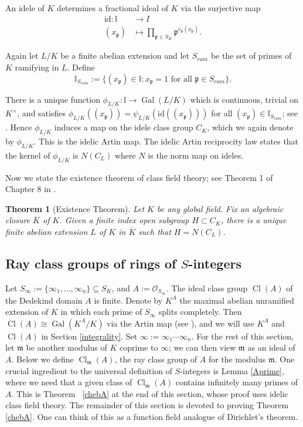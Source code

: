 \documentclass[12pt,reqno]{amsart}
\newcommand{\mm}{\mathfrak{m}}
\newcommand{\OO}{\mathcal{O}}
\newcommand{\pp}{\mathfrak{p}}
\newcommand{\II}{\mathbb{I}}
\DeclareMathOperator{\Gal}{Gal}
\DeclareMathOperator{\Cl}{Cl}
\newtheorem{thm}{Theorem}[section]
\theoremstyle{definition}
\begin{document}
An idele of $K$ determines a fractional ideal of $K$ via the surjective map
\begin{align*}
\text{id}: \II &\to I \\
(x_{\pp})&\mapsto \prod_{\pp\in S_K} \pp^{v_{\pp}(x_{\pp})}.
\end{align*}

Again let $L/K$ be a finite abelian extension and let $S_{ram}$ be the set of primes of $K$ ramifying in $L$. Define
\[
\II_{S_{ram}}:=\{(x_{\pp})\in \II: x_{\pp}=1 \text{ for all } \pp \in S_{ram}\}.
\]

There is a unique function $\phi_{L/K}: \II \to \Gal(L/K)$ which is
continuous, trivial on $K^{\times}$, and satisfies
$\phi_{L/K}((x_{\pp}))=\psi_{L/K}(\text{id}((x_{\pp})))$ for all
$(x_{\pp})\in \II_{S_{ram}}$; see  \cite{Ta67}. Hence $\phi_{L/K}$ induces a map on the idele class
group $C_K$, which we again denote by $\phi_{L/K}$. This is the idelic
Artin map. The idelic Artin reciprocity law states that the kernel of
$\phi_{L/K}$ is $N(C_L)$ where $N$ is the norm map on ideles.

Now we state the existence theorem of class field theory; see Theorem 1 of Chapter 8 in \cite{ATcft}. 

\begin{thm}[Existence Theorem]\label{existthm}	
  Let $K$ be any global field. Fix an algebraic closure $\overline{K}$
  of $K$. Given a finite index open subgroup $H\subset C_K$, there is
  a unique finite abelian extension $L$ of $K$ in $\overline{K}$ such
  that $H=N(C_L)$.
\end{thm}


\subsection{Ray class groups of rings of $S$-integers}


Let $S_{\infty}:=\{\infty_1,\ldots,\infty_n\} \subseteq S_K$, and
$A:=\OO_{S_{\infty}}$. The ideal class group $\Cl(A)$ of the Dedekind
domain $A$ is finite. Denote by $K^A$ the maximal abelian unramified
extension of $K$ in which each prime of $S_{\infty}$ splits
completely. Then $\Cl(A)\cong \Gal(K^A/K)$ via the Artin map (see
\cite{Rosen87}), and we will use $K^A$ and $\Cl(A)$ in Section \ref{integrality}. Set $\infty:=\infty_1\cdots\infty_n$. For the rest of this section, let $\mm$ be another modulus of $K$ coprime to $\infty$; we can then view $\mm$ as an ideal of $A$. Below we define $\Cl_{\mm}(A)$, the ray class group of $A$ for the modulus $\mm$. One crucial ingredient to the universal definition of $S$-integers is Lemma \ref{Aprime}, where we need that a given class of $\Cl_{\mm}(A)$ contains infinitely many primes of $A$. This is Theorem ~\ref{chebA} at the end of this section, whose proof uses idelic class field theory. The remainder of this section is devoted to proving Theorem \ref{chebA}. One can think of this as a function field analogue of Dirichlet's theorem.
\end{document}

